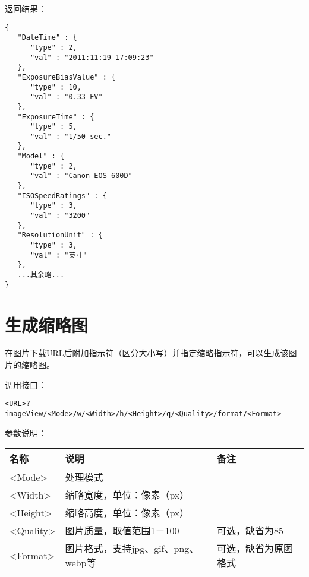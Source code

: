 \documentclass[11pt, oneside]{book}
\newcommand{\qpar}[1]{
\vspace{0.25em}
\noindent
#1\par
\vspace{0.25em}
}
\newcommand{\qqbox}[1]{\hspace{0.2em}\fbox{#1}\hspace{0.2em}}
\newcommand{\qtable}[1]{\footnotesize\vspace{0.5em}#1\vspace{0.5em}\normalsize}
\begin{document}
\begin{CJK*}{UTF8}{song}
\begin{sample}
    \qpar{返回结果：}
\begin{verbatim}
{
   "DateTime" : {
      "type" : 2,
      "val" : "2011:11:19 17:09:23"
   },
   "ExposureBiasValue" : {
      "type" : 10,
      "val" : "0.33 EV"
   },
   "ExposureTime" : {
      "type" : 5,
      "val" : "1/50 sec."
   },
   "Model" : {
      "type" : 2,
      "val" : "Canon EOS 600D"
   },
   "ISOSpeedRatings" : {
      "type" : 3,
      "val" : "3200"
   },
   "ResolutionUnit" : {
      "type" : 3,
      "val" : "英寸"
   },
   ...其余略...
}
\end{verbatim}
  \label{exif}
\end{sample}

\clearpage

\section{生成缩略图}

\qpar{在图片下载URL后附加\qqbox{imageView}指示符（区分大小写）并指定缩略指示符，可以生成该图片的缩略图。}
\qpar{调用接口：}
\begin{lstlisting}[basicstyle=\ttfamily\footnotesize]
<URL>?imageView/<Mode>/w/<Width>/h/<Height>/q/<Quality>/format/<Format>
\end{lstlisting}


\qpar{参数说明：}
\qtable{
\def\arraystretch{2}
\begin{tabular}{|l|l|l|}
\hline
名称 & 说明 & 备注\\
\hline
\textless Mode\textgreater & 处理模式 & \\
\hline
\textless Width\textgreater & 缩略宽度，单位：像素（px） & \\
\hline
\textless Height\textgreater & 缩略高度，单位：像素（px） & \\
\hline
\textless Quality\textgreater & 图片质量，取值范围1－100 & 可选，缺省为85 \\
\hline
\textless Format\textgreater & 图片格式，支持jpg、gif、png、webp等 & 可选，缺省为原图格式 \\
\hline
\end{tabular}
}


\end{CJK*}
\end{document}
